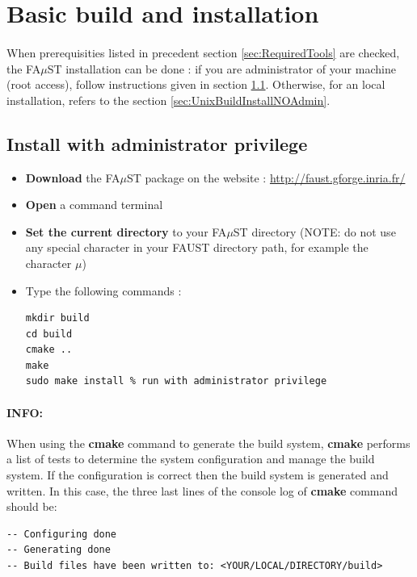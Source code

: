 \section{Basic build and installation}\label{sec:UnixBuildInstall}
\paragraph{}When prerequisities listed in precedent section \ref{sec:RequiredTools} are checked, the FA$\mu$ST installation can be done : 
if you are administrator of your machine (root access), follow instructions given in section \ref{sec:UnixBuildInstallAdmin}. Otherwise, for an local installation, refers to the section \ref{sec:UnixBuildInstallNOAdmin}. 

\subsection{Install with administrator privilege}\label{sec:UnixBuildInstallAdmin}

\begin{itemize}
\item \textbf{Download} the FA$\mu$ST package on the website :  \url{http://faust.gforge.inria.fr/}
\item \textbf{Open} a command terminal
\item \textbf{Set the current directory} to your FA$\mu$ST directory (NOTE: do not use any special character in your FAUST directory path, for example the character $\mu$)
\item Type the following commands : 
\begin{lstlisting}
mkdir build
cd build
cmake ..
make
sudo make install % run with administrator privilege
\end{lstlisting}
\end{itemize}

\paragraph{INFO:}When using the \textbf{cmake} command to generate the build system, \textbf{cmake} performs a list of tests to determine the system configuration and manage the build system. If the configuration is correct then the build system is generated and written. In this case, the three last lines of the console log of \textbf{cmake} command should be:
\begin{lstlisting}
-- Configuring done 
-- Generating done 
-- Build files have been written to: <YOUR/LOCAL/DIRECTORY/build>
\end{lstlisting}

